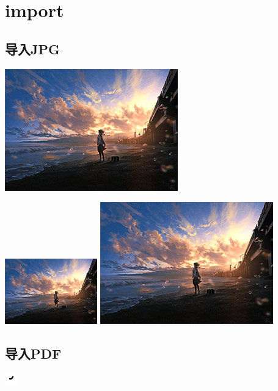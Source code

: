 \documentclass[UTF8]{ctexrep}
\begin{document}
\section{import}

\subsection{导入JPG}
\par
\includegraphics[scale=0.5]{file.png}
\par
\includegraphics[width=0.3\textwidth,angle=90]{file.png}
\includegraphics[height=0.3\textwidth]{file.png}

\subsection{导入PDF}
\includegraphics[scale=20]{file.pdf}
\end{document}

